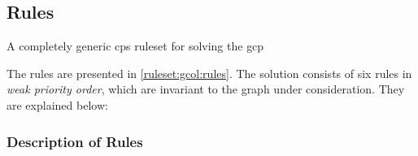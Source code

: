 \subsection{\label{sec:gcol:rules}Rules}

\begin{cprulesetfloat}
\begin{cpruleset}

    
    
    
    
    
\end{cpruleset}
\caption[\gls{cps} \gls{ruleset} for the ]{\label{ruleset:gcol:rules}A completely generic \gls{cps} \gls{ruleset} for solving the \gls{gcp}}
\end{cprulesetfloat}

The rules are presented in \cref{ruleset:gcol:rules}.  The solution consists of six rules in \emph{weak priority order}, which are invariant to the graph under consideration.  They are explained below:

\subsubsection{Description of Rules}

